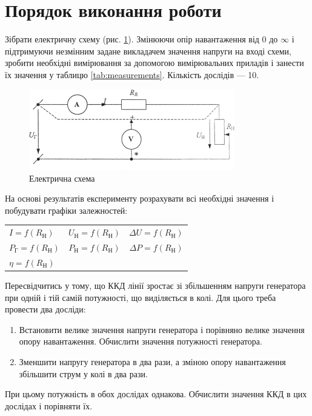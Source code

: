 \documentclass[a4paper,oneside,DIV=10,12pt]{scrartcl}
\begin{document}
	\section{Порядок виконання роботи}
		Зібрати електричну схему (рис. \ref{fig:schematic}). Змінюючи опір навантаження від $0$ до $\infty$ і підтримуючи незмінним задане викладачем значення напруги на вході схеми, зробити необхідні вимірювання за допомогою вимірювальних приладів і занести їх значення у таблицю \ref{tab:measurements}. Кількість дослідів --- 10.
		
		\begin{figure}[!htbp]
			\centering
				\includegraphics[width=0.8\textwidth]{schematic.png}
			\caption{Електрична схема}
			\label{fig:schematic}
		\end{figure}
		
		На основі результатів експерименту розрахувати всі необхідні значення і побудувати графіки залежностей: %
		
		\begin{table}[H]
			\centering
			\begin{tabular}{lcr}
			$I = f\left(R_{\text{Н}}\right)$ & $U_{\text{Н}} = f\left(R_{\text{Н}}\right)$ & $\Delta U = f\left(R_{\text{Н}}\right)$\\
			$P_{\text{Г}} = f\left(R_{\text{Н}}\right)$ &  $P_{\text{Н}} = f\left(R_{\text{Н}}\right)$ & $\Delta P = f\left(R_{\text{Н}}\right)$\\
			$\eta = f\left(R_{\text{Н}}\right)$
			\end{tabular}
		\end{table}
		
		Пересвідчитись у тому, що ККД лінії зростає зі збільшенням напруги генератора при одній і тій самій потужності, що виділяється в колі. Для цього треба провести два досліди:
		\begin{enumerate}
			\item Встановити велике значення напруги генератора і порівняно велике значення опору навантаження. Обчислити значення потужності генератора.
			\item Зменшити напругу генератора в два рази, а зміною опору навантаження збільшити струм у колі в два рази.
		\end{enumerate}
		При цьому потужність в обох дослідах однакова. Обчислити значення ККД в цих дослідах і порівняти їх.
		
\end{document}
